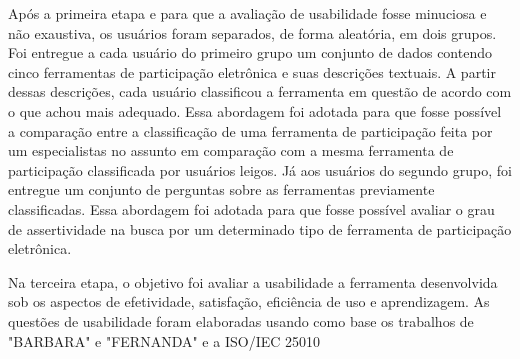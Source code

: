 \par
Após a primeira etapa e para que a avaliação de usabilidade fosse minuciosa e não exaustiva, os usuários foram separados, de forma aleatória, em dois grupos.
Foi entregue a cada usuário do primeiro grupo um conjunto de dados contendo cinco ferramentas de participação eletrônica e suas descrições textuais.
A partir dessas descrições, cada usuário classificou a ferramenta em questão de acordo com o que achou mais adequado.
Essa abordagem foi adotada para que fosse possível a comparação entre a classificação de uma ferramenta de participação feita por um especialistas no assunto em comparação com
a mesma ferramenta de participação classificada por usuários leigos.
Já aos usuários do segundo grupo, foi entregue um conjunto de perguntas sobre as ferramentas previamente classificadas. Essa abordagem foi adotada para que fosse possível avaliar
o grau de assertividade na busca por um determinado tipo de ferramenta de participação eletrônica.

\par
Na terceira etapa, o objetivo foi avaliar a usabilidade a ferramenta desenvolvida sob os aspectos de efetividade, satisfação, eficiência de uso e aprendizagem. 
As questões de usabilidade foram elaboradas usando como base os trabalhos de "BARBARA" e "FERNANDA" e a ISO/IEC 25010